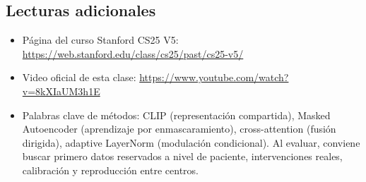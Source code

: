 \documentclass[a4paper]{article}
\begin{document}
\subsection{Lecturas adicionales}

\begin{itemize}[itemsep=0.2em,topsep=0.2em]
  \item Página del curso Stanford CS25 V5: \url{https://web.stanford.edu/class/cs25/past/cs25-v5/}
  \item Video oficial de esta clase: \url{https://www.youtube.com/watch?v=8kXIaUM3h1E}
  \item Palabras clave de métodos: CLIP (representación compartida), Masked Autoencoder (aprendizaje por enmascaramiento), cross-attention (fusión dirigida), adaptive LayerNorm (modulación condicional). Al evaluar, conviene buscar primero datos reservados a nivel de paciente, intervenciones reales, calibración y reproducción entre centros.
\end{itemize}
\end{document}
